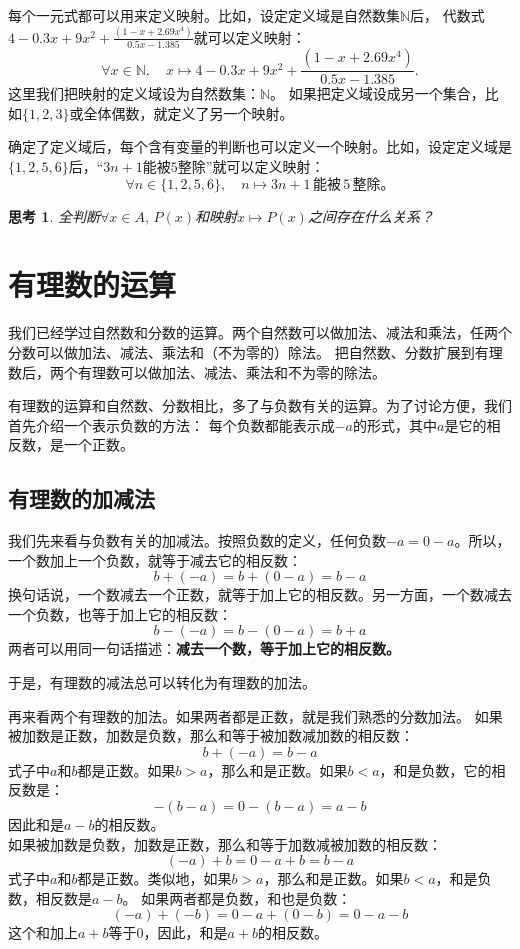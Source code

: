 \documentclass[12pt,UTF8]{ctexbook}
\newtheorem{sk}{思考}[section]
\begin{document}
每个一元式都可以用来定义映射。比如，设定定义域是自然数集$\mathbb{N}$后，
代数式$4-0.3x+9x^2+\frac{(1-x+2.69x^4)}{0.5x-1.385}$就可以定义映射：
$$ \forall x\in\mathbb{N}, \quad x \mapsto 4-0.3x+9x^2+\frac{(1-x+2.69x^4)}{0.5x-1.385}. $$
这里我们把映射的定义域设为自然数集：$\mathbb{N}$。
如果把定义域设成另一个集合，比如$\{1,2,3\}$或全体偶数，就定义了另一个映射。

确定了定义域后，每个含有变量的判断也可以定义一个映射。比如，设定定义域是$\{1,2,5,6\}$后，“$3n+1$能被$5$整除”就可以定义映射：
$$ \forall n\in \{1,2,5,6\} , \quad n \mapsto 3n+1\,\mbox{能被}\,5\,\mbox{整除。} $$

\begin{sk}\label{sk:2-0-2}
    全判断$\forall x \in A, \, P(x)$和映射$x \mapsto P(x)$之间存在什么关系？
\end{sk}

\chapter{有理数的运算}
我们已经学过自然数和分数的运算。两个自然数可以做加法、减法和乘法，任两个分数可以做加法、减法、乘法和（不为零的）除法。
把自然数、分数扩展到有理数后，两个有理数可以做加法、减法、乘法和不为零的除法。

有理数的运算和自然数、分数相比，多了与负数有关的运算。为了讨论方便，我们首先介绍一个表示负数的方法：
每个负数都能表示成$-a$的形式，其中$a$是它的相反数，是一个正数。

\section{有理数的加减法}
我们先来看与负数有关的加减法。按照负数的定义，任何负数$-a = 0 - a$。所以，一个数加上一个负数，就等于减去它的相反数：
$$ b + (-a) = b + (0 - a) = b - a$$
换句话说，一个数减去一个正数，就等于加上它的相反数。另一方面，一个数减去一个负数，也等于加上它的相反数：
$$ b - (-a) = b - (0 - a) = b + a$$
两者可以用同一句话描述：\textbf{减去一个数，等于加上它的相反数。}

于是，有理数的减法总可以转化为有理数的加法。

再来看两个有理数的加法。如果两者都是正数，就是我们熟悉的分数加法。
如果被加数是正数，加数是负数，那么和等于被加数减加数的相反数：
$$ b + (-a) = b - a$$
式子中$a$和$b$都是正数。如果$b > a$，那么和是正数。如果$b < a$，和是负数，它的相反数是：
$$ -(b - a) = 0 - (b - a) = a - b$$
因此和是$a - b$的相反数。\\
如果被加数是负数，加数是正数，那么和等于加数减被加数的相反数：
$$ (-a) + b = 0 - a + b = b - a$$
式子中$a$和$b$都是正数。类似地，如果$b > a$，那么和是正数。如果$b < a$，和是负数，相反数是$a - b$。
如果两者都是负数，和也是负数：
$$ (-a) + (-b) = 0 - a + (0 - b) = 0 - a - b$$
这个和加上$a + b$等于$0$，因此，和是$a + b$的相反数。
\end{document}
